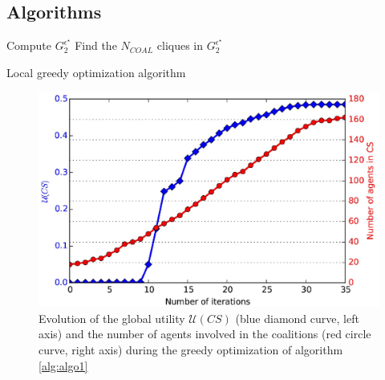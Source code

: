 \documentclass[journal]{IEEEtran}
\begin{document}
\pagestyle{plain}

\appendix


\subsection{Algorithms}


\begin{algorithm}
 Compute $ G_{2}^{\epsilon^{\star}} $ \;
 Find the $ N_{COAL} $ cliques in $ G_{2}^{\epsilon^{\star}} $\;
 \caption{Local greedy optimization algorithm}
 \label{alg:algo1}
\end{algorithm}



\begin{figure}[b]
\includegraphics[scale=.5]{figure_8.eps}
\caption{Evolution of the global utility $ \mathcal{U}(CS) $ (blue diamond curve, left axis) and the number of agents involved in the coalitions (red circle curve, right axis) during the greedy optimization of algorithm \ref{alg:algo1} }
\label{fig:search}
\end{figure}
\end{document}
